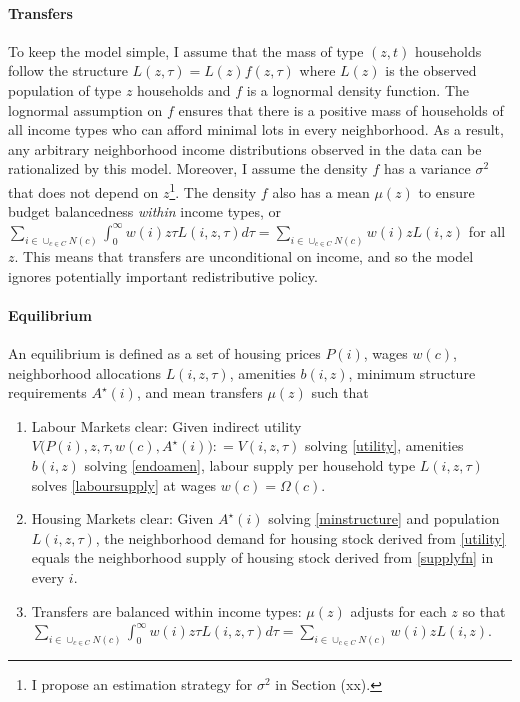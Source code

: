 \documentclass[]{article}
\begin{document}
\paragraph*{Transfers} To keep the model simple, I assume that the mass of type $(z, t)$ households follow the structure $L(z, \tau) = L(z)f(z, \tau)$ where $L(z)$ is the observed population of type $z$ households and $f$ is a lognormal density function. The lognormal assumption on $f$ ensures that there is a positive mass of households of all income types who can afford minimal lots in every neighborhood. As a result, any arbitrary neighborhood income distributions observed in the data can be rationalized by this model. Moreover, I assume the density $f$ has a variance $\sigma^{2}$ that does not depend on $z$\footnote{I propose an estimation strategy for $\sigma^{2}$ in Section (xx).}.  The density $f$ also has a mean $\mu(z)$ to ensure budget balancedness \textit{within} income types, or $\sum_{i \in \cup_{c \in C}N(c)}\int_{0}^{\infty}w(i)z\tau L(i, z, \tau)d\tau = \sum_{i \in \cup_{c \in C}N(c)}w(i)zL(i, z)$ for all $z$. This means that transfers are unconditional on income, and so the model ignores potentially important redistributive policy.

\paragraph*{Equilibrium} An equilibrium is defined as a set of housing prices $P(i)$, wages $w(c)$, neighborhood allocations $L(i, z, \tau)$, amenities $b(i, z)$, minimum structure requirements $A^{\star}(i)$, and mean transfers $\mu(z)$ such that 
\begin{enumerate}
	\item Labour Markets clear: Given indirect utility $V\big(P(i), z, \tau, w(c), A^{\star}(i)\big) : = V(i, z, \tau)$ solving \eqref{utility}, amenities $b(i, z)$ solving \eqref{endoamen}, labour supply per household type $L(i, z, \tau)$ solves \eqref{laboursupply} at wages $w(c) = \Omega(c)$.
	
	\item Housing Markets clear: Given $A^{\star}(i)$ solving \eqref{minstructure} and population $L(i, z, \tau)$, the neighborhood demand for housing stock derived from \eqref{utility} equals the neighborhood supply of housing stock derived from \eqref{supplyfn} in every $i$. 
	
	\item Transfers are balanced within income types: $\mu(z)$ adjusts for each $z$ so that $\sum_{i \in \cup_{c \in C}N(c)}\int_{0}^{\infty}w(i)z\tau L(i, z, \tau)d\tau = \sum_{i \in \cup_{c \in C}N(c)}w(i)zL(i, z)$. 
	
\end{enumerate}
\end{document}

